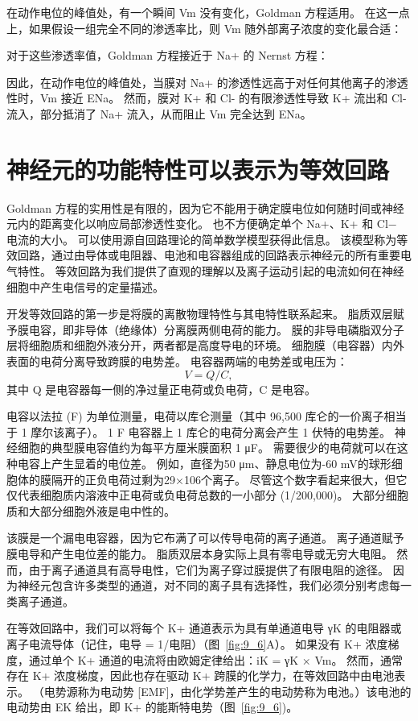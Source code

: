 在动作电位的峰值处，有一个瞬间 Vm 没有变化，Goldman 方程适用。 
在这一点上，如果假设一组完全不同的渗透率比，则 Vm 随外部离子浓度的变化最合适：


对于这些渗透率值，Goldman 方程接近于 Na+ 的 Nernst 方程：


因此，在动作电位的峰值处，当膜对 Na+ 的渗透性远高于对任何其他离子的渗透性时，Vm 接近 ENa。 
然而，膜对 K+ 和 Cl- 的有限渗透性导致 K+ 流出和 Cl- 流入，部分抵消了 Na+ 流入，从而阻止 Vm 完全达到 ENa。



\section{神经元的功能特性可以表示为等效回路}

Goldman 方程的实用性是有限的，因为它不能用于确定膜电位如何随时间或神经元内的距离变化以响应局部渗透性变化。
也不方便确定单个 Na+、K+ 和 Cl− 电流的大小。
可以使用源自回路理论的简单数学模型获得此信息。
该模型称为等效回路，通过由导体或电阻器、电池和电容器组成的回路表示神经元的所有重要电气特性。
等效回路为我们提供了直观的理解以及离子运动引起的电流如何在神经细胞中产生电信号的定量描述。


开发等效回路的第一步是将膜的离散物理特性与其电特性联系起来。
脂质双层赋予膜电容，即非导体（绝缘体）分离膜两侧电荷的能力。
膜的非导电磷脂双分子层将细胞质和细胞外液分开，两者都是高度导电的环境。
细胞膜（电容器）内外表面的电荷分离导致跨膜的电势差。
电容器两端的电势差或电压为：
\begin{equation}
	V = Q/C,
\end{equation}
其中 Q 是电容器每一侧的净过量正电荷或负电荷，C 是电容。


电容以法拉 (F) 为单位测量，电荷以库仑测量（其中 96,500 库仑的一价离子相当于 1 摩尔该离子）。
1 F 电容器上 1 库仑的电荷分离会产生 1 伏特的电势差。
神经细胞的典型膜电容值约为每平方厘米膜面积 1 μF。 
需要很少的电荷就可以在这种电容上产生显着的电位差。 
例如，直径为50 μm、静息电位为-60 mV的球形细胞体的膜隔开的正负电荷过剩为29×106个离子。
尽管这个数字看起来很大，但它仅代表细胞质内溶液中正电荷或负电荷总数的一小部分 (1/200,000)。
大部分细胞质和大部分细胞外液是电中性的。


该膜是一个漏电电容器，因为它布满了可以传导电荷的离子通道。
离子通道赋予膜电导和产生电位差的能力。
脂质双层本身实际上具有零电导或无穷大电阻。
然而，由于离子通道具有高导电性，它们为离子穿过膜提供了有限电阻的途径。
因为神经元包含许多类型的通道，对不同的离子具有选择性，我们必须分别考虑每一类离子通道。


在等效回路中，我们可以将每个 K+ 通道表示为具有单通道电导 γK 的电阻器或离子电流导体（记住，电导 = 1/电阻）（图~\ref{fig:9_6}A）。 
如果没有 K+ 浓度梯度，通过单个 K+ 通道的电流将由欧姆定律给出：iK = γK × Vm。
然而，通常存在 K+ 浓度梯度，因此也存在驱动 K+ 跨膜的化学力，在等效回路中由电池表示。
（电势源称为电动势 [EMF]，由化学势差产生的电动势称为电池。）该电池的电动势由 EK 给出，即 K+ 的能斯特电势（图~\ref{fig:9_6})。


